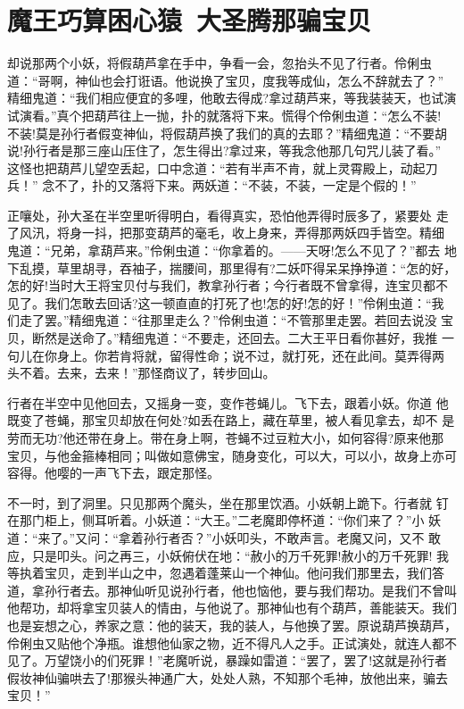 \chapter{魔王巧算困心猿~大圣腾那骗宝贝}

却说那两个小妖，将假葫芦拿在手中，争看一会，忽抬头不见了行者。伶俐虫
道：“哥啊，神仙也会打诳语。他说换了宝贝，度我等成仙，怎么不辞就去了？”
精细鬼道：“我们相应便宜的多哩，他敢去得成?拿过葫芦来，等我装装天，也试演
试演看。”真个把葫芦往上一抛，扑的就落将下来。慌得个伶俐虫道：“怎么不装!
不装!莫是孙行者假变神仙，将假葫芦换了我们的真的去耶？”精细鬼道：“不要胡
说!孙行者是那三座山压住了，怎生得出?拿过来，等我念他那几句咒儿装了看。”
这怪也把葫芦儿望空丢起，口中念道：“若有半声不肯，就上灵霄殿上，动起刀兵！”
念不了，扑的又落将下来。两妖道：“不装，不装，一定是个假的！”

正嚷处，孙大圣在半空里听得明白，看得真实，恐怕他弄得时辰多了，紧要处
走了风汛，将身一抖，把那变葫芦的毫毛，收上身来，弄得那两妖四手皆空。精细
鬼道：“兄弟，拿葫芦来。”伶俐虫道：“你拿着的。——天呀!怎么不见了？”都去
地下乱摸，草里胡寻，吞袖子，揣腰间，那里得有?二妖吓得呆呆挣挣道：“怎的好，
怎的好!当时大王将宝贝付与我们，教拿孙行者；今行者既不曾拿得，连宝贝都不
见了。我们怎敢去回话?这一顿直直的打死了也!怎的好!怎的好！”伶俐虫道：“我
们走了罢。”精细鬼道：“往那里走么？”伶俐虫道：“不管那里走罢。若回去说没
宝贝，断然是送命了。”精细鬼道：“不要走，还回去。二大王平日看你甚好，我推
一句儿在你身上。你若肯将就，留得性命；说不过，就打死，还在此间。莫弄得两
头不着。去来，去来！”那怪商议了，转步回山。

行者在半空中见他回去，又摇身一变，变作苍蝇儿。飞下去，跟着小妖。你道
他既变了苍蝇，那宝贝却放在何处?如丢在路上，藏在草里，被人看见拿去，却不
是劳而无功?他还带在身上。带在身上啊，苍蝇不过豆粒大小，如何容得?原来他那
宝贝，与他金箍棒相同；叫做如意佛宝，随身变化，可以大，可以小，故身上亦可
容得。他嘤的一声飞下去，跟定那怪。

不一时，到了洞里。只见那两个魔头，坐在那里饮酒。小妖朝上跪下。行者就
钉在那门柜上，侧耳听着。小妖道：“大王。”二老魔即停杯道：“你们来了？”小
妖道：“来了。”又问：“拿着孙行者否？”小妖叩头，不敢声言。老魔又问，又不
敢应，只是叩头。问之再三，小妖俯伏在地：“赦小的万千死罪!赦小的万千死罪!
我等执着宝贝，走到半山之中，忽遇着蓬莱山一个神仙。他问我们那里去，我们答
道，拿孙行者去。那神仙听见说孙行者，他也恼他，要与我们帮功。是我们不曾叫
他帮功，却将拿宝贝装人的情由，与他说了。那神仙也有个葫芦，善能装天。我们
也是妄想之心，养家之意：他的装天，我的装人，与他换了罢。原说葫芦换葫芦，
伶俐虫又贴他个净瓶。谁想他仙家之物，近不得凡人之手。正试演处，就连人都不
见了。万望饶小的们死罪！”老魔听说，暴躁如雷道：“罢了，罢了!这就是孙行者
假妆神仙骗哄去了!那猴头神通广大，处处人熟，不知那个毛神，放他出来，骗去
宝贝！”

